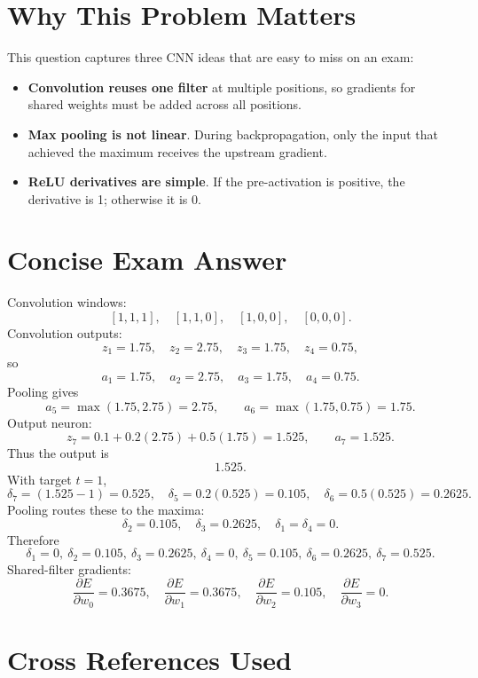 \documentclass[11pt]{article}
\begin{document}
\section*{Why This Problem Matters}

This question captures three CNN ideas that are easy to miss on an exam:
\begin{itemize}
\item \textbf{Convolution reuses one filter} at multiple positions, so gradients for shared weights must be added across all positions.
\item \textbf{Max pooling is not linear}. During backpropagation, only the input that achieved the maximum receives the upstream gradient.
\item \textbf{ReLU derivatives are simple}. If the pre-activation is positive, the derivative is 1; otherwise it is 0.
\end{itemize}

\section*{Concise Exam Answer}

Convolution windows:
\[
[1,1,1],\quad [1,1,0],\quad [1,0,0],\quad [0,0,0].
\]
Convolution outputs:
\[
z_1=1.75,\quad z_2=2.75,\quad z_3=1.75,\quad z_4=0.75,
\]
so
\[
a_1=1.75,\quad a_2=2.75,\quad a_3=1.75,\quad a_4=0.75.
\]
Pooling gives
\[
a_5=\max(1.75,2.75)=2.75,\qquad
a_6=\max(1.75,0.75)=1.75.
\]
Output neuron:
\[
z_7=0.1+0.2(2.75)+0.5(1.75)=1.525,
\qquad
a_7=1.525.
\]
Thus the output is
\[
\boxed{1.525.}
\]
With target \(t=1\),
\[
\delta_7=(1.525-1)=0.525,
\quad
\delta_5=0.2(0.525)=0.105,
\quad
\delta_6=0.5(0.525)=0.2625.
\]
Pooling routes these to the maxima:
\[
\delta_2=0.105,\quad \delta_3=0.2625,\quad \delta_1=\delta_4=0.
\]
Therefore
\[
\boxed{
\delta_1=0,\ \delta_2=0.105,\ \delta_3=0.2625,\ \delta_4=0,\ \delta_5=0.105,\ \delta_6=0.2625,\ \delta_7=0.525.
}
\]
Shared-filter gradients:
\[
\boxed{
\frac{\partial E}{\partial w_0}=0.3675,\quad
\frac{\partial E}{\partial w_1}=0.3675,\quad
\frac{\partial E}{\partial w_2}=0.105,\quad
\frac{\partial E}{\partial w_3}=0.
}
\]

\section*{Cross References Used}
\end{document}
